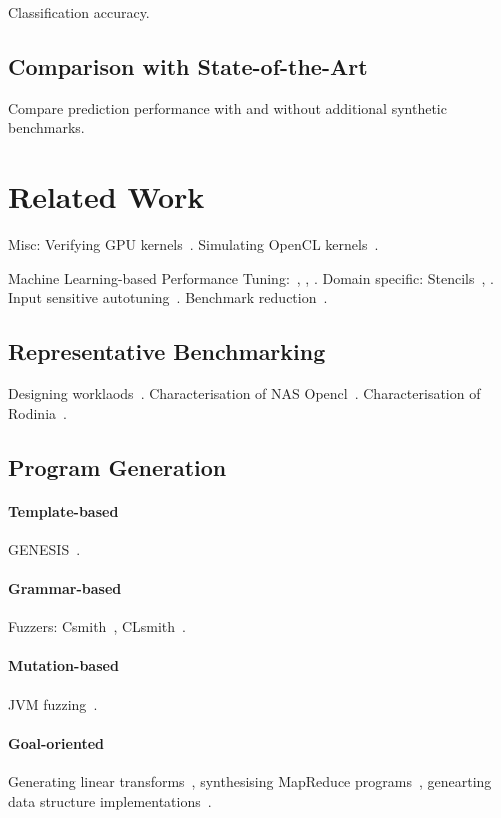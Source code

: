 \documentclass[preprint,nonatbib,10pt,nocopyrightspace]{sigplanconf}
\begin{document}
Classification accuracy.


\subsection{Comparison with State-of-the-Art}\label{subsec:}

Compare prediction performance with and without additional synthetic
benchmarks.


\section{Related Work}\label{sec:related-work}

Misc: Verifying GPU kernels~\cite{Betts2012}. Simulating OpenCL
kernels~\cite{Price2015}.

Machine Learning-based Performance Tuning:~\cite{Wen2015},
\cite{Magni2014}, \cite{Falch2015}. Domain specific:
Stencils~\cite{Garvey2015b}, \cite{Cummins2015a}. Input sensitive
autotuning~\cite{Ding2015}. Benchmark reduction~\cite{Castro2014}.


\subsection{Representative Benchmarking}

Designing worklaods~\cite{Eeckhout2002}. Characterisation of NAS
Opencl~\cite{Seo2011}. Characterisation of
Rodinia~\cite{Che2010,Ryoo2015}.


\subsection{Program Generation}


\paragraph{Template-based} GENESIS~\cite{Chiu2015}.


\paragraph{Grammar-based} Fuzzers:
Csmith~\cite{Yang2012}, CLsmith~\cite{Pflanzer2016}.


\paragraph{Mutation-based} JVM fuzzing~\cite{Chena}.


\paragraph{Goal-oriented} Generating linear
transforms~\cite{Voronenko2009}, synthesising MapReduce
programs~\cite{Smith}, genearting data structure
implementations~\cite{Loncaric2016}.
\end{document}
